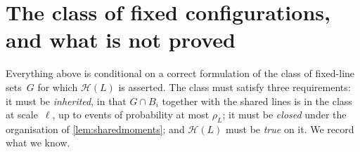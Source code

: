 \documentclass[11pt,letterpaper]{article}
\begin{document}
\section{The class of fixed configurations, and what is not proved}
\label{sec:class}

Everything above is conditional on a correct formulation of the class of fixed-line sets~$G$ for which $\mathcal H(L)$ is asserted. The class must satisfy three requirements: it must be \emph{inherited}, in that $G\cap B_i$ together with the shared lines is in the class at scale~$\ell$, up to events of probability at most $\rho_L$; it must be \emph{closed} under the organisation of \cref{lem:sharedmoments}; and $\mathcal H(L)$ must be \emph{true} on it. We record what we know.
\end{document}
